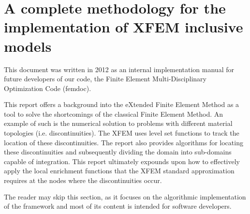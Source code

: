 \chapter{A complete methodology for the implementation of XFEM inclusive models}
\label{sec:a_complete_methodology_for_the_implementation_of_XFEM_inclusive_models}


This document was written in 2012 as an internal implementation manual for future developers of our code, the Finite Element Multi-Disciplinary Optimization Code (femdoc).

This report offers a background into the eXtended Finite Element Method as a tool to solve the shortcomings of the classical Finite Element Method. An example of such is the numerical solution to problems with different material topologies (i.e. discontinuities). The XFEM uses level set functions to track the location of these discontinuities. The report also provides algorithms for locating these discontinuities and subsequently dividing the domain into sub-domains capable of integration. This report ultimately expounds upon how to effectively apply the local enrichment functions that the XFEM standard approximation requires at the nodes where the discontinuities occur.

The reader may skip this section, as it focuses on the algorithmic implementation of the framework and most of its content is intended for software developers.



 
 
 


